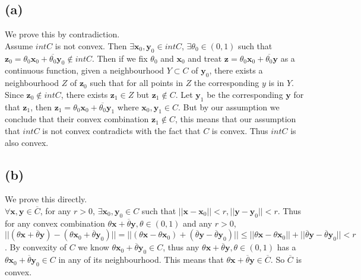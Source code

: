 \documentclass[12pt,letterpaper]{article}
\begin{document}
\subsection*{(a)}
We prove this by contradiction.\\
Assume $intC$ is not convex. Then $\exists\boldsymbol{x}_0,\boldsymbol{y}_0\in intC$, $\exists \theta_0\in(0,1)$ such that $\boldsymbol{z}_0=\theta_0\boldsymbol{x}_0+\overline{\theta_0}\boldsymbol{y}_0\notin intC$. Then if we fix $\theta_0$ and $\boldsymbol{x}_0$ and treat $\boldsymbol{z}=\theta_0\boldsymbol{x}_0+\overline{\theta_0}\boldsymbol{y}$ as a  continuous function, given a neighbourhood $Y\subset C$ of $\boldsymbol{y}_0$, there exists a neighbourhood $Z$ of $\boldsymbol{z}_0$ such that for all points in $Z$ the corresponding $y$ is in $Y$. Since $\boldsymbol{z}_0\notin intC$, there exists $\boldsymbol{z}_1\in Z$ but $\boldsymbol{z}_1\notin C$. Let $\boldsymbol{y}_1$ be the corresponding $\boldsymbol{y}$ for that $\boldsymbol{z}_1$, then $\boldsymbol{z}_1=\theta_0\boldsymbol{x}_0+\overline{\theta_0}\boldsymbol{y}_1$ where $\boldsymbol{x}_0,\boldsymbol{y}_1\in C$. But by our assumption we conclude that their convex combination $\boldsymbol{z}_1\notin C$, this means that our assumption that $intC$ is not convex contradicts with the fact that $C$ is convex. Thus $intC$ is also convex. 
\subsection*{(b)}
We prove this directly.\\
$\forall\boldsymbol{x},\boldsymbol{y}\in\overline{C}$, for any $r>0$, $\exists\boldsymbol{x}_0,\boldsymbol{y}_0\in C$ such that $||\boldsymbol{x}-\boldsymbol{x}_0||<r,||\boldsymbol{y}-\boldsymbol{y}_0||<r$. Thus for any convex combination $\theta\boldsymbol{x}+\overline{\theta}\boldsymbol{y},\theta\in(0,1)$ and any $r>0$, $||(\theta\boldsymbol{x}+\overline{\theta}\boldsymbol{y})-(\theta\boldsymbol{x}_0+\overline{\theta}\boldsymbol{y}_0)||=||(\theta\boldsymbol{x}-\theta\boldsymbol{x}_0)+(\overline{\theta}\boldsymbol{y}-\overline{\theta}\boldsymbol{y}_0)||\leq||\theta\boldsymbol{x}-\theta\boldsymbol{x}_0||+||\overline{\theta}\boldsymbol{y}-\overline{\theta}\boldsymbol{y}_0||<r$. By convexity of $C$ we know $\theta\boldsymbol{x}_0+\overline{\theta}\boldsymbol{y}_0\in C$, thus any  $\theta\boldsymbol{x}+\overline{\theta}\boldsymbol{y},\theta\in(0,1)$ has a $\theta\boldsymbol{x}_0+\overline{\theta}\boldsymbol{y}_0\in C$ in any of its neighbourhood. This means that $\theta\boldsymbol{x}+\overline{\theta}\boldsymbol{y}\in\overline{C}$. So $\overline{C}$ is convex.
\end{document}
